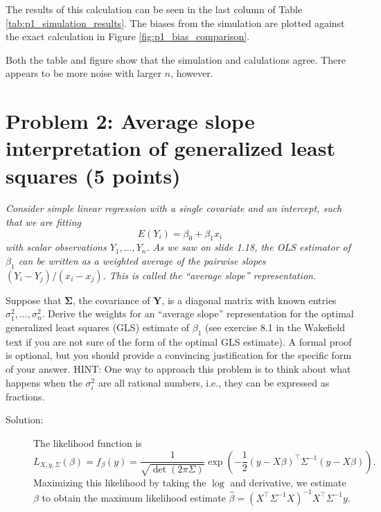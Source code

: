 \documentclass[11pt, letterpaper]{article}
\newcommand{\bY}{{\bm Y}}
\newcommand{\bSigma}{{\bm \Sigma}}
\begin{document}
{\begin{enumerate}[(a)]
\begin{description}
  The results of this calculation can be seen in the last column of Table
  \ref{tab:p1_simulation_results}. The biases from the simulation are plotted
  against the exact calculation in Figure \ref{fig:p1_bias_comparison}.

  Both the table and figure show that the simulation and calulations
  agree. There appears to be more noise with larger $n$, however.
\end{description}
\end{enumerate}



\section*{Problem 2: Average slope interpretation of generalized least squares (5 points)}
{\em Consider simple linear regression with a
single covariate and an intercept, such that we are fitting
\[
E(Y_i)=\beta_0 + \beta_1 x_i
\]
with scalar observations $Y_1,\ldots,Y_n$. As we saw on slide 1.18, the OLS estimator of $\beta_1$ can
be written as a weighted average of the pairwise slopes $(Y_i-Y_j)/(x_i-x_j)$.
This is called the ``average slope'' representation.
}
\begin{enumerate}[(a)]
{\em \item Suppose that $\bSigma$, the covariance of $\bY$, is a diagonal matrix with known entries $\sigma_1^2,\ldots,\sigma_n^2$.
  Derive the weights for an ``average slope'' representation for the optimal generalized least squares (GLS) estimate of $\beta_1$ (see exercise 8.1 in the Wakefield text if you are not sure of the form of the optimal GLS estimate).  A formal proof is optional, but you should provide a convincing justification for the specific form of your answer.  HINT: One way to approach this problem is to think about what happens when the $\sigma^2_i$ are all rational numbers, i.e., they can be expressed as fractions.}

\begin{description}
\item[Solution:] The likelihood function is
  \begin{equation}
    L_{X,y,\Sigma}\left(\beta\right) = f_\beta\left(y\right)
    = \frac{1}{\sqrt{\det\left(2\pi\Sigma\right)}}\exp\left(
      -\frac{1}{2}\left(y - X\beta\right)^{\intercal}\Sigma^{-1}\left(y - X\beta\right)
    \right).
  \end{equation}
  Maximizing this likelihood by taking the $\log$ and derivative, we estimate
  $\beta$ to obtain the maximum likelihood estimate
  $\hat{\beta} =
  \left(X^\intercal\Sigma^{-1}X\right)^{-1}X^\intercal\Sigma^{-1}y$.


\end{description}
\end{enumerate}}
\end{document}
